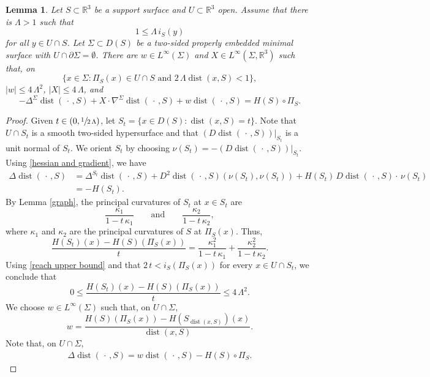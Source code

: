 \documentclass[11pt]{amsart}
\newtheorem{lem}[prop]{Lemma}
\begin{document}
\begin{appendices}
\begin{lem}
 Let $S\subset \mathbb{R}^3$ be a support surface and  
$U\subset \mathbb{R}^3$  open. Assume that there is $\Lambda>1$ such that 
$$
1\leq \Lambda\,i_S(y)
$$
for all $y\in U\cap S$. Let $\Sigma\subset D(S)$ be a two-sided properly embedded minimal surface with  $U\cap \partial \Sigma=\emptyset$.  There are $w\in L^\infty(\Sigma)$ and $X\in L^\infty(\Sigma,\mathbb{R}^3)$ such that, on $$\{x\in \Sigma:\Pi_S(x)\in U\cap S\text{ and }2\,\Lambda\operatorname{dist}(x,S)<1\},$$ $|w|\leq 4\,\Lambda^2$, $|X|\leq 4\,\Lambda$,  and
		$$
		-\Delta^\Sigma \operatorname{dist}(\,\cdot\,,S)+X\cdot \nabla^\Sigma \operatorname{dist}(\,\cdot\,,S)+w\operatorname{dist}(\,\cdot\,,S)=H(S)\circ \Pi_S.
		$$ 
	\end{lem}
	\begin{proof}
		Given $t\in(0,\sfrac{1}{2\,\Lambda})$, let $S_t=\{x\in D(S):\operatorname{dist}(x,S)=t\}$. Note that $U\cap S_t$ is a smooth two-sided hypersurface and that  $(D\operatorname{dist}(\,\cdot\,,S))|_{S_t}$ is a unit normal of $S_t$. We orient $S_t$ by choosing $\nu(S_t)=-(D\operatorname{dist}(\,\cdot\,,S))|_{S_t}$. Using \eqref{hessian and gradient}, we have   
		\begin{equation*}  
		\begin{aligned}   
		\Delta \operatorname{dist}(\,\cdot\,,S)&=\Delta^{S_t}\operatorname{dist}(\,\cdot\,,S)+D^2\operatorname{dist}(\,\cdot\,,S)(\nu(S_t),\nu(S_t))+H(S_t)\,D\operatorname{dist}(\,\cdot\,,S)\cdot\,\nu(S_t)\\&=-H(S_t).
		\end{aligned} 
		\end{equation*}	
		By Lemma \ref{graph}, the principal curvatures of $S_t$ at $x\in S_t$ are 
		$$
		\frac{\kappa_1}{1-t\,\kappa_1}\qquad\text{and}\qquad \frac{\kappa_2}{1-t\,\kappa_2},
		$$
		where $\kappa_1$ and $\kappa_2$ are the principal curvatures of $S$ at $\Pi_S(x)$. Thus,
		$$
		\frac{H(S_t)(x)-H(S)(\Pi_S(x))}{t}=\frac{\kappa_1^2}{1-t\,\kappa_1}+\frac{\kappa_2^2}{1-t\,\kappa_2}.
		$$
		Using \eqref{reach upper bound} and that $2\,t<i_S(\Pi_S(x))$ for every $x\in U\cap S_t$, we conclude that
		$$
		0\leq 	\frac{H(S_t)(x)-H(S)(\Pi_S(x))}{t}\leq 4\,\Lambda^2.
		$$
		We choose $w\in L^\infty(\Sigma)$ such that, on $U\cap \Sigma$, 
		$$
		w=\frac{H(S)(\Pi_S(x))-H(S_{\operatorname{dist}(x,S)})(x)}{\operatorname{dist}(x,S)}.
		$$
		Note that, on $U\cap \Sigma$, 
		\begin{align} \label{subharmonic}
\Delta \operatorname{dist}(\,\cdot\,,S)=w\operatorname{dist}(\,\cdot\,,S)-H(S)\circ \Pi_S.
		\end{align}
		

\end{proof}
\end{appendices}
\end{document}
